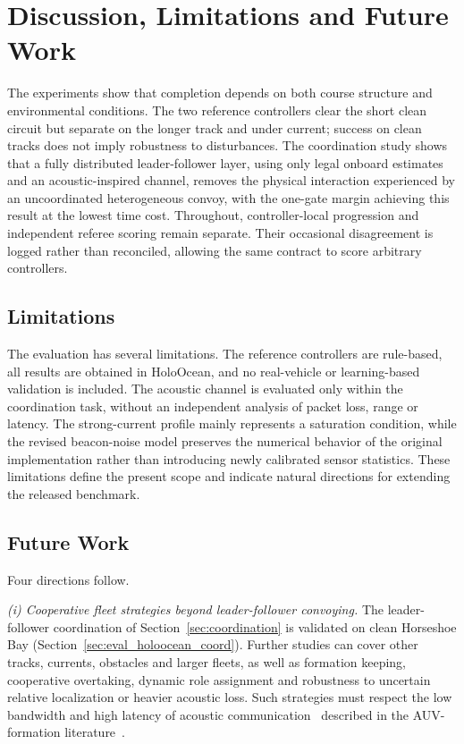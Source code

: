 \section{Discussion, Limitations and Future Work}
\label{sec:discussion}

The experiments show that completion depends on both course structure and environmental conditions. The two reference controllers clear the short clean circuit but separate on the longer track and under current; success on clean tracks does not imply robustness to disturbances. The coordination study shows that a fully distributed leader-follower layer, using only legal onboard estimates and an acoustic-inspired channel, removes the physical interaction experienced by an uncoordinated heterogeneous convoy, with the one-gate margin achieving this result at the lowest time cost. Throughout, controller-local progression and independent referee scoring remain separate. Their occasional disagreement is logged rather than reconciled, allowing the same contract to score arbitrary controllers.

\subsection{Limitations}
\label{sec:limitations}

The evaluation has several limitations. The reference controllers are rule-based, all results are obtained in HoloOcean, and no real-vehicle or learning-based validation is included. The acoustic channel is evaluated only within the coordination task, without an independent analysis of packet loss, range or latency. The strong-current profile mainly represents a saturation condition, while the revised beacon-noise model preserves the numerical behavior of the original implementation rather than introducing newly calibrated sensor statistics. These limitations define the present scope and indicate natural directions for extending the released benchmark.

\subsection{Future Work}

Four directions follow.

\emph{(i) Cooperative fleet strategies beyond leader-follower convoying.} The leader-follower coordination of Section~\ref{sec:coordination} is validated on clean Horseshoe Bay (Section~\ref{sec:eval_holoocean_coord}). Further studies can cover other tracks, currents, obstacles and larger fleets, as well as formation keeping, cooperative overtaking, dynamic role assignment and robustness to uncertain relative localization or heavier acoustic loss. Such strategies must respect the low bandwidth and high latency of acoustic communication~\cite{stojanovic2009underwater} described in the AUV-formation literature~\cite{yang2021survey,yan2023formation}.

